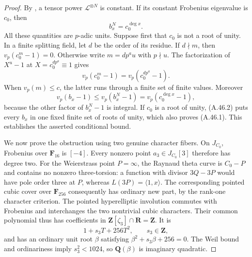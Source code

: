 \documentclass[11pt]{article}
\begin{document}
\begin{proof}
By \cite[Proposition~8.6, p.~42]{AC_HartlPal2025}, a tensor power
$\mathcal L^{\otimes N}$ is constant. If its constant Frobenius
eigenvalue is $c_0$, then
\[
                         b_x^N=c_0^{\deg x}.           \tag{A.46.2}
\]
All these quantities are $p$-adic units. Suppose first that $c_0$
is not a root of unity. In a finite splitting field, let $d$ be the
order of its residue. If $d\nmid m$, then
$v_p(c_0^m-1)=0$. Otherwise write $m=dp^a u$ with $p\nmid u$.
The factorization of $X^u-1$ at
$X=c_0^{dp^a}\equiv1$ gives
\[
 v_p(c_0^m-1)=v_p(c_0^{dp^a}-1).
\]
When $v_p(m)\le c$, the latter runs through a finite set of finite
values. Moreover
\[
 v_p(b_x-1)\le v_p(b_x^N-1)=v_p(c_0^{\deg x}-1),
\]
because the other factor of $b_x^N-1$ is integral. If $c_0$ is a
root of unity, (A.46.2) puts every $b_x$ in one fixed finite set
of roots of unity, which also proves (A.46.1). This establishes
the asserted conditional bound.

We now prove the obstruction using two genuine character fibers.
On $J_{C_0}$, Frobenius over $\mathbf F_{16}$ is $[-4]$.
Every nonzero point $a_3\in J_{C_0}[3]$ therefore has degree two.
For the Weierstrass point $P=\infty$, the Raynaud theta curve is
$C_0-P$ and contains no nonzero three-torsion: a function with
divisor $3Q-3P$ would have pole order three at $P$, whereas
$L(3P)=\langle1,x\rangle$. The corresponding pointed cubic
cover over $\mathbf F_{256}$ consequently has ordinary new part,
by the rank-one character criterion. The pointed hyperelliptic
involution commutes with Frobenius and interchanges the two
nontrivial cubic characters. Their common polynomial thus has
coefficients in
$\mathbf Z[\zeta_3]\cap\mathbf R=\mathbf Z$. It is
\[
                         1+s_3T+256T^2,
 \qquad s_3\in\mathbf Z,
\]
and has an ordinary unit root $\beta$ satisfying
$\beta^2+s_3\beta+256=0$. The Weil bound and ordinariness imply
$s_3^2<1024$, so $\mathbf Q(\beta)$ is imaginary quadratic.


\end{proof}
\end{document}
